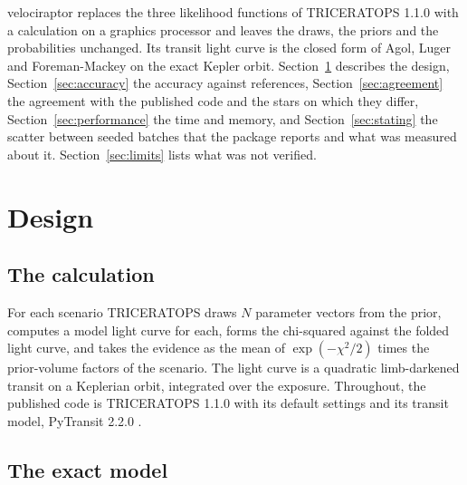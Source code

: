 \documentclass[11pt]{article}
\begin{document}
velociraptor replaces the three likelihood functions of TRICERATOPS 1.1.0 with a calculation on a graphics processor and leaves the draws, the priors and the probabilities unchanged. Its transit light curve is the closed form of Agol, Luger and Foreman-Mackey \cite{agol2020} on the exact Kepler orbit. Section~\ref{sec:design} describes the design, Section~\ref{sec:accuracy} the accuracy against references, Section~\ref{sec:agreement} the agreement with the published code and the stars on which they differ, Section~\ref{sec:performance} the time and memory, and Section~\ref{sec:stating} the scatter between seeded batches that the package reports and what was measured about it. Section~\ref{sec:limits} lists what was not verified.

\section{Design}\label{sec:design}

\subsection{The calculation}

For each scenario TRICERATOPS draws $N$ parameter vectors from the prior, computes a model light curve for each, forms the chi-squared against the folded light curve, and takes the evidence as the mean of $\exp(-\chi^2/2)$ times the prior-volume factors of the scenario. The light curve is a quadratic limb-darkened transit \cite{mandel2002} on a Keplerian orbit, integrated over the exposure. Throughout, the published code is TRICERATOPS 1.1.0 with its default settings and its transit model, PyTransit 2.2.0 \cite{parviainen2015}.

\subsection{The exact model}
\end{document}
